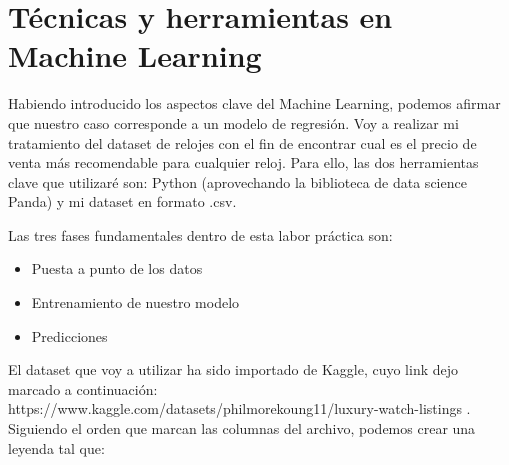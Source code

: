 

\section{Técnicas y herramientas en Machine Learning}

	Habiendo introducido los aspectos clave del Machine Learning, podemos afirmar que nuestro caso corresponde a un modelo de regresión. Voy a realizar mi tratamiento del dataset de relojes con el fin de encontrar cual es el precio de venta más recomendable para cualquier reloj. Para ello, las dos herramientas clave que utilizaré son: Python (aprovechando la biblioteca de data science Panda) y mi dataset en formato .csv.
	
	Las tres fases fundamentales dentro de esta labor práctica son:

\begin{itemize}
	\item Puesta a punto de los datos
	\item Entrenamiento de nuestro modelo
	\item Predicciones
\end{itemize}

	El dataset que voy a utilizar ha sido importado de Kaggle, cuyo link dejo marcado a continuación: https://www.kaggle.com/datasets/philmorekoung11/luxury-watch-listings . Siguiendo el orden que marcan las columnas del archivo, podemos crear una leyenda tal que:

